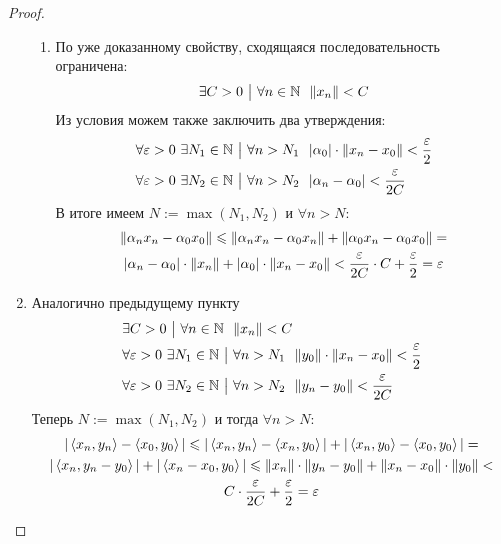 \begin{proof}
\begin{enumerate}
\begin{enumerate}
			\item По уже доказанному свойству, сходящаяся последовательность ограничена:
			\[
				\exists C > 0 \ \big|\  \forall n \in \mathbb{N}\ \ \|x_n\| < C
			\]
			Из условия можем также заключить два утверждения:
			\begin{align*}
				&{\forall \varepsilon > 0\ \exists N_1 \in \mathbb{N} \ \big|\  \forall n > N_1\ \ |\alpha_0| \cdot \|x_n - x_0\| < \frac{\varepsilon}{2}}
				\\
				&{\forall \varepsilon > 0\ \exists N_2 \in \mathbb{N} \ \big|\  \forall n > N_2\ \ |\alpha_n - \alpha_0| < \frac{\varepsilon}{2C}}
			\end{align*}
			В итоге имеем $N := \max(N_1, N_2)$ и $\forall n > N$:
			\begin{multline*}
				\|\alpha_n x_n - \alpha_0 x_0\| \leqslant \|\alpha_n x_n - \alpha_0 x_n\| + \|\alpha_0 x_n - \alpha_0 x_0\| =
				\\
				|\alpha_n - \alpha_0| \cdot \|x_n\| + |\alpha_0| \cdot \|x_n - x_0\| < \frac{\varepsilon}{2C} \cdot C + \frac{\varepsilon}{2} = \varepsilon
			\end{multline*}
		\end{enumerate}
	
		\item Аналогично предыдущему пункту
		\begin{align*}
			&{\exists C > 0 \ \big|\  \forall n \in \mathbb{N}\ \ \|x_n\| < C}
			\\
			&{\forall \varepsilon > 0\ \exists N_1 \in \mathbb{N} \ \big|\  \forall n > N_1\ \ \|y_0\| \cdot \|x_n - x_0\| < \frac{\varepsilon}{2}}
			\\
			&{\forall \varepsilon > 0\ \exists N_2 \in \mathbb{N} \ \big|\  \forall n > N_2\ \ \|y_n - y_0\| < \frac{\varepsilon}{2C}}
		\end{align*}
		Теперь $N := \max(N_1, N_2)$ и тогда $\forall n > N$:
		\begin{multline*}
			|\left\langle x_n, y_n\right\rangle - \left\langle x_0, y_0\right\rangle| \leqslant |\left\langle x_n, y_n\right\rangle - \left\langle x_n, y_0\right\rangle| + |\left\langle x_n, y_0\right\rangle - \left\langle x_0, y_0\right\rangle| =
			\\
			|\left\langle x_n, y_n - y_0\right\rangle| + |\left\langle x_n - x_0, y_0\right\rangle| \leqslant \|x_n\| \cdot \|y_n - y_0\| + \|x_n - x_0\| \cdot \|y_0\| <
			\\
			C \cdot \frac{\varepsilon}{2C} + \frac{\varepsilon}{2} = \varepsilon
		\end{multline*}
		

\end{enumerate}
\end{proof}
